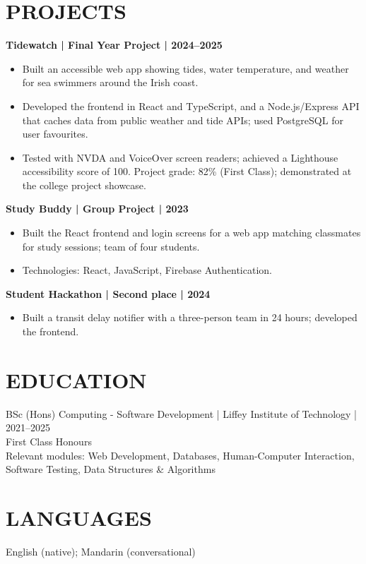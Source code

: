 \documentclass[11pt,a4paper]{article}
\newcommand{\cvsection}[1]{\section*{#1}}
\begin{document}
\cvsection{PROJECTS}
\textbf{Tidewatch | Final Year Project | 2024--2025}
\begin{itemize}
\item Built an accessible web app showing tides, water temperature, and weather for sea swimmers around the Irish coast.
\item Developed the frontend in React and TypeScript, and a Node.js/Express API that caches data from public weather and tide APIs; used PostgreSQL for user favourites.
\item Tested with NVDA and VoiceOver screen readers; achieved a Lighthouse accessibility score of 100. Project grade: 82\% (First Class); demonstrated at the college project showcase.
\end{itemize}
\textbf{Study Buddy | Group Project | 2023}
\begin{itemize}
\item Built the React frontend and login screens for a web app matching classmates for study sessions; team of four students.
\item Technologies: React, JavaScript, Firebase Authentication.
\end{itemize}
\textbf{Student Hackathon | Second place | 2024}
\begin{itemize}
\item Built a transit delay notifier with a three-person team in 24 hours; developed the frontend.
\end{itemize}

\cvsection{EDUCATION}
BSc (Hons) Computing - Software Development | Liffey Institute of Technology | 2021--2025\\
First Class Honours\\
Relevant modules: Web Development, Databases, Human-Computer Interaction, Software Testing, Data Structures \& Algorithms

\cvsection{LANGUAGES}
English (native); Mandarin (conversational)
\end{document}
